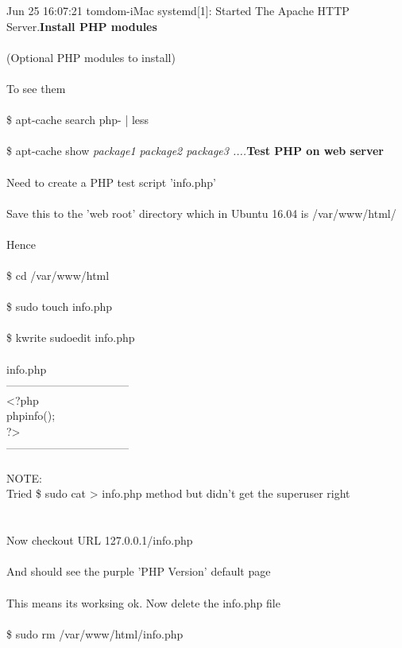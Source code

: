 \documentclass[10pt,a4paper]{article}
\begin{document}
{{{{{{{{{{{{{{{Jun 25 16:07:21 tomdom-iMac systemd[1]: Started The Apache HTTP Server.{\large \textbf{Install PHP modules}}{\large \\
\\
(Optional PHP modules to install)\\
\\
To see them\\
\\
\$ apt-cache search php- | less\\
\\
\$ apt-cache show \textit{package1 package2 package3 ....}}{\large \textbf{Test PHP on web server}}{\large \\
\\
Need to create a PHP test script 'info.php'\\
\\
Save this to the 'web root' directory which in Ubuntu 16.04 is /var/www/html/}{\large \\
\\
Hence\\
\\
\$ cd /var/www/html}{\large  \\
\\
\$ sudo touch info.php\\
\\
\$ kwrite sudoedit info.php\\
\\
info.php\\
---------------------------------\\
<?php \\
phpinfo();\\
?>\\
---------------------------------\\
\\
NOTE:\\
Tried \$ sudo cat > info.php   method but didn't get the superuser right\\
\\
\\
Now checkout URL  127.0.0.1/info.php  \\
\\
And should see the purple 'PHP Version' default page\\
\\
This means its worksing ok. Now delete the info.php file\\
\\
\$ sudo rm /var/www/html/info.php}{\large \\
\\
}}}}}}}}}}}}}}}}
\end{document}
